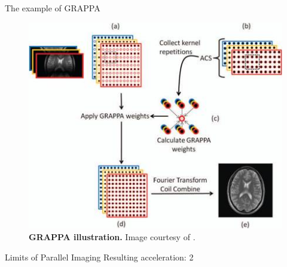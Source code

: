 \begin{frame}{The example of GRAPPA}
    \begin{figure}
        \centering
        \includegraphics[height=0.6\textheight]{Figures/intro_figures/GRAPPA.jpeg}
        \caption{\label{fig:GRAPPA}\textbf{GRAPPA illustration.} Image courtesy of \citet{deshmane2012parallel}.
        }
    \end{figure} 
\end{frame}

\begin{frame}{Limits of Parallel Imaging}
    Resulting acceleration: 2
\end{frame}